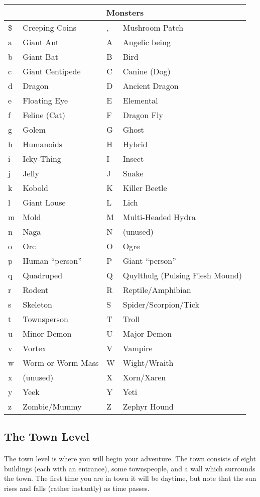 \paragraph{}
\begin{tabular}{|ll|ll|}
\hline
\multicolumn{4}{|c|}{Monsters}\\
\hline
\$&Creeping Coins&,&Mushroom Patch\\
a&Giant Ant&A&Angelic being\\
b&Giant Bat&B&Bird\\
c&Giant Centipede&C&Canine (Dog)\\
d&Dragon&D&Ancient Dragon\\
e&Floating Eye&E&Elemental\\
f&Feline (Cat)&F&Dragon Fly\\
g&Golem&G&Ghost\\
h&Humanoids&H&Hybrid\\
i&Icky-Thing&I&Insect\\
j&Jelly&J&Snake\\
k&Kobold&K&Killer Beetle\\
l&Giant Louse&L&Lich\\
m&Mold&M&Multi-Headed Hydra\\
n&Naga&N&(unused)\\
o&Orc&O&Ogre\\
p&Human ``person''&P&Giant ``person''\\
q&Quadruped&Q&Quylthulg (Pulsing Flesh Mound)\\
r&Rodent&R&Reptile/Amphibian\\
s&Skeleton&S&Spider/Scorpion/Tick\\
t&Townsperson&T&Troll\\
u&Minor Demon&U&Major Demon\\
v&Vortex&V&Vampire\\
w&Worm or Worm Mass&W&Wight/Wraith\\
x&(unused)&X&Xorn/Xaren\\
y&Yeek&Y&Yeti\\
z&Zombie/Mummy&Z&Zephyr Hound\\
\end{tabular}

\subsection{The Town Level}
\paragraph{}The town level is where you will begin your adventure. The
town consists of eight buildings (each with an entrance), some
townspeople, and a wall which surrounds the town. The first time you are
in town it will be daytime, but note that the sun rises and falls
(rather instantly) as time passes.


